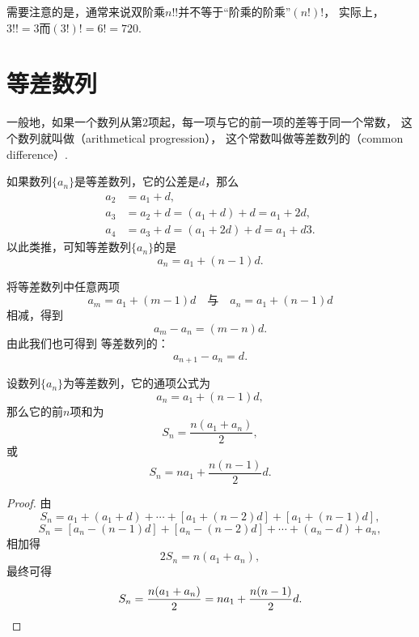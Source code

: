 需要注意的是，通常来说双阶乘\(n!!\)并不等于“阶乘的阶乘”\((n!)!\)，
实际上，\(3!! = 3\)而\((3!)! = 6! = 720\).

\section{等差数列}
一般地，如果一个数列从第2项起，每一项与它的前一项的差等于同一个常数，
这个数列就叫做（arithmetical progression），
这个常数叫做等差数列的（common difference）.

如果数列\(\{a_n\}\)是等差数列，它的公差是\(d\)，那么\begin{align*}
    a_2 &= a_1 + d, \\
    a_3 &= a_2 + d = (a_1 + d) + d = a_1 + 2d, \\
    a_4 &= a_3 + d = (a_1 + 2d) + d = a_1 + d3.
\end{align*}
以此类推，可知等差数列\(\{a_n\}\)的是\begin{equation}
    a_n = a_1 + (n-1) d.
\end{equation}

将等差数列中任意两项\begin{equation*}
    a_m = a_1 + (m-1) d
    \quad\text{与}\quad
    a_n = a_1 + (n-1) d
\end{equation*}相减，得到\begin{equation*}
    a_m - a_n = (m-n) d.
\end{equation*}
由此我们也可得到%
等差数列的：\begin{equation}
    a_{n+1} - a_n = d.
\end{equation}

\begin{property}[等差数列求和]
设数列\(\{a_n\}\)为等差数列，它的通项公式为\begin{equation*}
    a_n = a_1 + (n-1) d,
\end{equation*}
那么它的前\(n\)项和为\begin{equation}\label{equation:数列.等差数列的前n项和1}
    S_n = \frac{n(a_1 + a_n)}{2},
\end{equation}
或\begin{equation}\label{equation:数列.等差数列的前n项和2}
    S_n = n a_1 + \frac{n(n-1)}{2} d.
\end{equation}
\begin{proof}
由\begin{equation*}
    S_n = a_1 + (a_1 + d) + \dotsb + [a_1 + (n-2)d] + [a_1 + (n-1)d],
\end{equation*}\begin{equation*}
    S_n = [a_n - (n-1)d] + [a_n - (n-2)d] + \dotsb + (a_n - d) + a_n,
\end{equation*}相加得\begin{equation*}
    2 S_n = n(a_1 + a_n),
\end{equation*}最终可得\begin{equation*}
    S_n = \frac{n(a_1 + a_n)}{2} = n a_1 + \frac{n(n-1)}{2} d.
    \qedhere
\end{equation*}
\end{proof}
\end{property}

